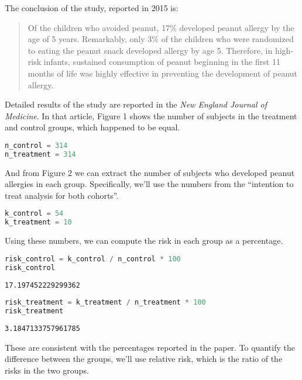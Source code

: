 The conclusion of the study, reported in 2015 is:

\begin{quote}
Of the children who avoided peanut, 17\% developed peanut allergy by the
age of 5 years. Remarkably, only 3\% of the children who were randomized
to eating the peanut snack developed allergy by age 5. Therefore, in
high-risk infants, sustained consumption of peanut beginning in the
first 11 months of life was highly effective in preventing the
development of peanut allergy.
\end{quote}

Detailed results of the study are reported in the \emph{New England
Journal of Medicine}. In that article, Figure 1 shows the number of
subjects in the treatment and control groups, which happened to be
equal.

\begin{lstlisting}[language=Python,style=source]
n_control = 314
n_treatment = 314
\end{lstlisting}

And from Figure 2 we can extract the number of subjects who developed
peanut allergies in each group. Specifically, we'll use the numbers from
the ``intention to treat analysis for both cohorts''.

\begin{lstlisting}[language=Python,style=source]
k_control = 54
k_treatment = 10
\end{lstlisting}

Using these numbers, we can compute the risk in each group as a
percentage.

\begin{lstlisting}[language=Python,style=source]
risk_control = k_control / n_control * 100
risk_control
\end{lstlisting}

\begin{lstlisting}[style=output]
17.197452229299362
\end{lstlisting}

\begin{lstlisting}[language=Python,style=source]
risk_treatment = k_treatment / n_treatment * 100
risk_treatment
\end{lstlisting}

\begin{lstlisting}[style=output]
3.1847133757961785
\end{lstlisting}

These are consistent with the percentages reported in the paper. To
quantify the difference between the groups, we'll use relative risk,
which is the ratio of the risks in the two groups.


